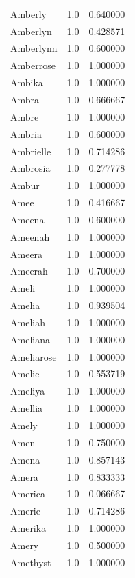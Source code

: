 \documentclass[
  letterpaper,
  DIV=11,
  numbers=noendperiod]{scrreprt}
\begin{document}
\begin{tabular}{lrr}
Amberly         &   1.0 &   0.640000 \\
Amberlyn        &   1.0 &   0.428571 \\
Amberlynn       &   1.0 &   0.600000 \\
Amberrose       &   1.0 &   1.000000 \\
Ambika          &   1.0 &   1.000000 \\
Ambra           &   1.0 &   0.666667 \\
Ambre           &   1.0 &   1.000000 \\
Ambria          &   1.0 &   0.600000 \\
Ambrielle       &   1.0 &   0.714286 \\
Ambrosia        &   1.0 &   0.277778 \\
Ambur           &   1.0 &   1.000000 \\
Amee            &   1.0 &   0.416667 \\
Ameena          &   1.0 &   0.600000 \\
Ameenah         &   1.0 &   1.000000 \\
Ameera          &   1.0 &   1.000000 \\
Ameerah         &   1.0 &   0.700000 \\
Ameli           &   1.0 &   1.000000 \\
Amelia          &   1.0 &   0.939504 \\
Ameliah         &   1.0 &   1.000000 \\
Ameliana        &   1.0 &   1.000000 \\
Ameliarose      &   1.0 &   1.000000 \\
Amelie          &   1.0 &   0.553719 \\
Ameliya         &   1.0 &   1.000000 \\
Amellia         &   1.0 &   1.000000 \\
Amely           &   1.0 &   1.000000 \\
Amen            &   1.0 &   0.750000 \\
Amena           &   1.0 &   0.857143 \\
Amera           &   1.0 &   0.833333 \\
America         &   1.0 &   0.066667 \\
Amerie          &   1.0 &   0.714286 \\
Amerika         &   1.0 &   1.000000 \\
Amery           &   1.0 &   0.500000 \\
Amethyst        &   1.0 &   1.000000 \\

\end{tabular}
\end{document}
